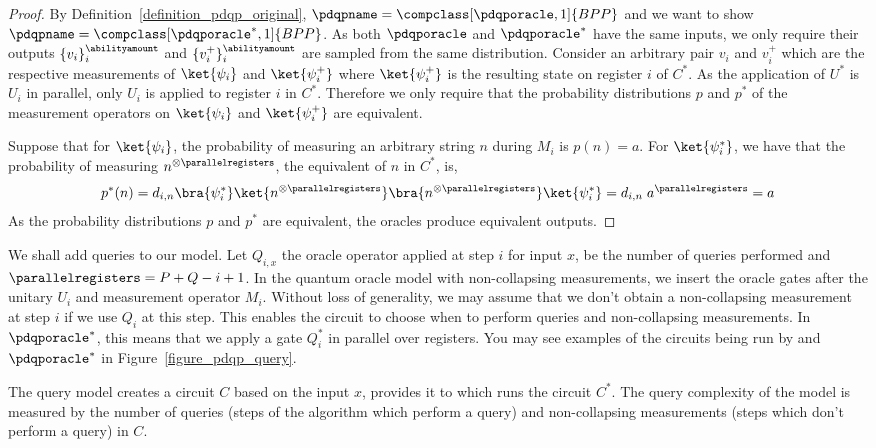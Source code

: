 \begin{proof}
    By Definition~\ref{definition_pdqp_original}, $\pdqpname=\compclass[\pdqporacle,1]{BPP}$ and we want to show $\pdqpname=\compclass[\pdqporacle^*,1]{BPP}$. As both $\pdqporacle$ and $\pdqporacle^*$ have the same inputs, we only require their outputs $\{v_i\}_i^\abilityamount$ and $\{v_i^+\}_i^\abilityamount$ are sampled from the same distribution. Consider an arbitrary pair $v_i$ and $v_i^+$ which are the respective measurements of $\ket{\psi_i}$ and $\ket{\psi_i^+}$ where $\ket{\psi_i^+}$ is the resulting state on register $i$ of $C^*$. As the application of $U^*$ is $U_i$ in parallel, only $U_i$ is applied to register $i$ in $C^*$. Therefore we only require that the probability distributions $p$ and $p^*$ of the measurement operators on $\ket{\psi_i}$ and $\ket{\psi_i^+}$ are equivalent.

    Suppose that for $\ket{\psi_i}$, the probability of measuring an arbitrary string $n$ during $M_i$ is $p(n)=a$. For $\ket{\psi_{i}^*}$, we have that the probability of measuring $n^{\otimes \parallelregisters}$, the equivalent of $n$ in $C^*$, is,
    \begin{align*}
        p^*(n) =  d_{i,n} \bra{\psi_{i}^*}\ket{n^{\otimes \parallelregisters}}\bra{n^{\otimes \parallelregisters}}\ket{\psi_{i}^*} = d_{i,n}\;a^{\parallelregisters} = a
    \end{align*}
    As the probability distributions $p$ and $p^*$ are equivalent, the oracles produce equivalent outputs.
\end{proof}

We shall add queries to our model. Let $Q_{i,x}$ the oracle operator applied at step $i$ for input $x$, \queryamount be the number of queries performed and $\parallelregisters = P + Q - i + 1$. In the quantum oracle model with non-collapsing measurements, we insert the oracle gates after the unitary $U_i$ and measurement operator $M_i$. Without loss of generality, we may assume that we don't obtain a non-collapsing measurement at step $i$ if we use $Q_i$ at this step. This enables the circuit to choose when to perform queries and non-collapsing measurements. In $\pdqporacle^*$, this means that we apply a gate $Q_i^*$ in parallel over \parallelregisters registers. You may see examples of the circuits being run by \pdqporacle and $\pdqporacle^*$ in Figure~\ref{figure_pdqp_query}. 

\begin{definition}\label{definition_pdqp_our}
    The \pdqpname query model creates a circuit $C$ based on the input $x$, provides it to \pdqporacle which runs the circuit $C^*$. The query complexity of the model is measured by the number of queries \queryamount (steps of the algorithm which perform a query) and non-collapsing measurements \abilityamount (steps which don't perform a query) in $C$.
\end{definition}

